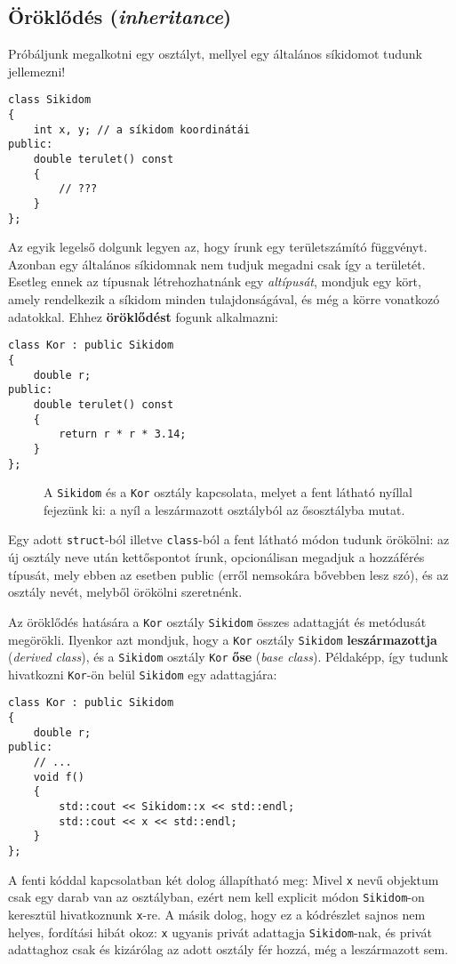 \documentclass[a4paper,11.5pt,table]{article}
\begin{document}
	\subsection{Öröklődés (\textit{inheritance})}
	Próbáljunk megalkotni egy osztályt, mellyel egy általános síkidomot tudunk jellemezni!
	\begin{lstlisting}
class Sikidom
{
	int x, y; // a síkidom koordinátái
public:
	double terulet() const
	{
		// ???
	}
};
	\end{lstlisting}
	Az egyik legelső dolgunk legyen az, hogy írunk egy területszámító függvényt. Azonban egy általános síkidomnak nem tudjuk megadni csak így a területét. Esetleg ennek az típusnak létrehozhatnánk egy \textit{altípusát}, mondjuk egy kört, amely rendelkezik a síkidom minden tulajdonságával, és még a körre vonatkozó adatokkal. Ehhez \textbf{öröklődést} fogunk alkalmazni:
	\begin{lstlisting}
class Kor : public Sikidom
{
	double r;
public:
	double terulet() const
	{
		return r * r * 3.14;
	}
};
	\end{lstlisting}
	\begin{figure}[!h]
		\centering
		
		\smallskip
		A \texttt{Sikidom} és a \texttt{Kor} osztály kapcsolata, melyet a fent látható nyíllal fejezünk ki: a nyíl a leszármazott osztályból az ősosztályba mutat.
	\end{figure}
	Egy adott \texttt{struct}-ból illetve \texttt{class}-ból a fent látható módon tudunk örökölni: az új osztály neve után kettőspontot írunk, opcionálisan megadjuk a hozzáférés típusát, mely ebben az esetben public (erről nemsokára bővebben lesz szó), és az osztály nevét, melyből örökölni szeretnénk.

	Az öröklődés hatására a \texttt{Kor} osztály \texttt{Sikidom} összes adattagját és metódusát megörökli. Ilyenkor azt mondjuk, hogy a \texttt{Kor} osztály \texttt{Sikidom} \textbf{leszármazottja} (\textit{derived class}), és a \texttt{Sikidom} osztály \texttt{Kor} \textbf{őse} (\textit{base class}). Példaképp, így tudunk hivatkozni \texttt{Kor}-ön belül \texttt{Sikidom} egy adattagjára:
	\begin{lstlisting}
class Kor : public Sikidom
{
	double r;
public:
	// ...
	void f()
	{
		std::cout << Sikidom::x << std::endl;
		std::cout << x << std::endl;
	}
};
	\end{lstlisting}
	A fenti kóddal kapcsolatban két dolog állapítható meg: Mivel \texttt{x} nevű objektum csak egy darab van az osztályban, ezért nem kell explicit módon \texttt{Sikidom}-on keresztül hivatkoznunk \texttt{x}-re. A másik dolog, hogy ez a kódrészlet sajnos nem helyes, fordítási hibát okoz: \texttt{x} ugyanis privát adattagja \texttt{Sikidom}-nak, és privát adattaghoz csak és kizárólag az adott osztály fér hozzá, még a leszármazott sem.
\end{document}
